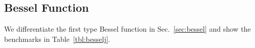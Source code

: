 \documentclass{article}
\newcommand{\<}{\langle}
\renewcommand{\>}{\rangle}
\newcommand{\Tbl}[1]{Table~\ref{#1}}
\newcommand{\Sec}[1]{Sec.~\ref{#1}}
\newcommand{\ra}[1]{\renewcommand{\arraystretch}{#1}}
\theoremstyle{definition}\newtheorem{definition}{\textit{Definition}}
\begin{document}
\subsection{Bessel Function}
We differentiate the first type Bessel function in \Sec{sec:bessel} and show the benchmarks in \Tbl{tbl:besselj}.
\begin{table}[h!]\centering
\begin{minipage}{0.8\columnwidth}
\ra{1.3}
    \caption{Time and space used for computing objective (O) and gradient (G) of the first kind Bessel function $J_2(1.0)$.
}\label{tbl:besselj}
\end{minipage}
\end{table}
\end{document}
